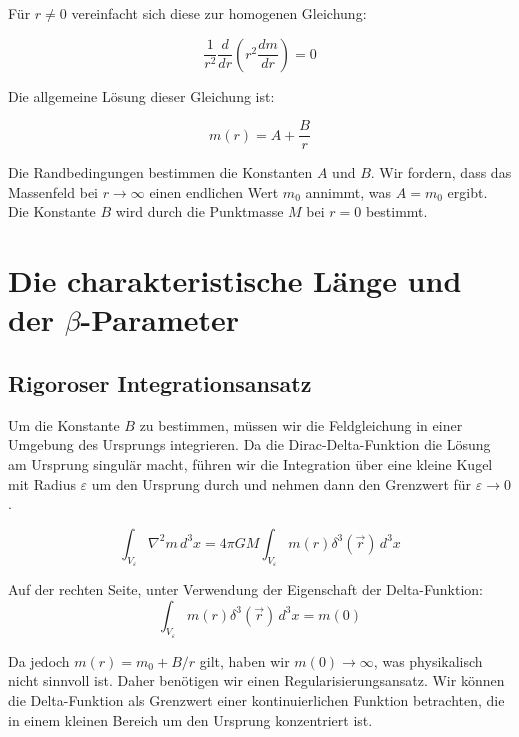 \documentclass[12pt,a4paper]{article}
\begin{document}
Für $r \neq 0$ vereinfacht sich diese zur homogenen Gleichung:

\begin{equation}
	\frac{1}{r^2} \frac{d}{dr}\left(r^2 \frac{dm}{dr}\right) = 0
\end{equation}

Die allgemeine Lösung dieser Gleichung ist:

\begin{equation}
	m(r) = A + \frac{B}{r}
\end{equation}

Die Randbedingungen bestimmen die Konstanten $A$ und $B$. Wir fordern, dass das Massenfeld bei $r \to \infty$ einen endlichen Wert $m_0$ annimmt, was $A = m_0$ ergibt. Die Konstante $B$ wird durch die Punktmasse $M$ bei $r = 0$ bestimmt.

\section{Die charakteristische Länge und der $\beta$-Parameter}
\label{sec:characteristic_length}

\subsection{Rigoroser Integrationsansatz}
\label{subsec:rigorous_integration}

Um die Konstante $B$ zu bestimmen, müssen wir die Feldgleichung in einer Umgebung des Ursprungs integrieren. Da die Dirac-Delta-Funktion die Lösung am Ursprung singulär macht, führen wir die Integration über eine kleine Kugel mit Radius $\varepsilon$ um den Ursprung durch und nehmen dann den Grenzwert für $\varepsilon \to 0$.

\begin{equation}
	\int_{V_\varepsilon} \nabla^2 m \, d^3x = 4\pi G M \int_{V_\varepsilon} m(r) \delta^3(\vec{r}) \, d^3x
\end{equation}

Auf der rechten Seite, unter Verwendung der Eigenschaft der Delta-Funktion:
\begin{equation}
	\int_{V_\varepsilon} m(r) \delta^3(\vec{r}) \, d^3x = m(0)
\end{equation}

Da jedoch $m(r) = m_0 + B/r$ gilt, haben wir $m(0) \to \infty$, was physikalisch nicht sinnvoll ist. Daher benötigen wir einen Regularisierungsansatz. Wir können die Delta-Funktion als Grenzwert einer kontinuierlichen Funktion betrachten, die in einem kleinen Bereich um den Ursprung konzentriert ist.
\end{document}
